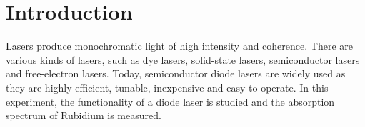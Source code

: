 \section*{Introduction}
Lasers produce monochromatic light of high intensity and coherence. There are various kinds 
of lasers, such as dye lasers, solid-state lasers, semiconductor lasers and free-electron lasers.
Today, semiconductor diode lasers are widely used as they are highly efficient, tunable, 
inexpensive and easy to operate. In this experiment, the 
functionality of a diode laser is studied and the absorption spectrum of Rubidium is measured.